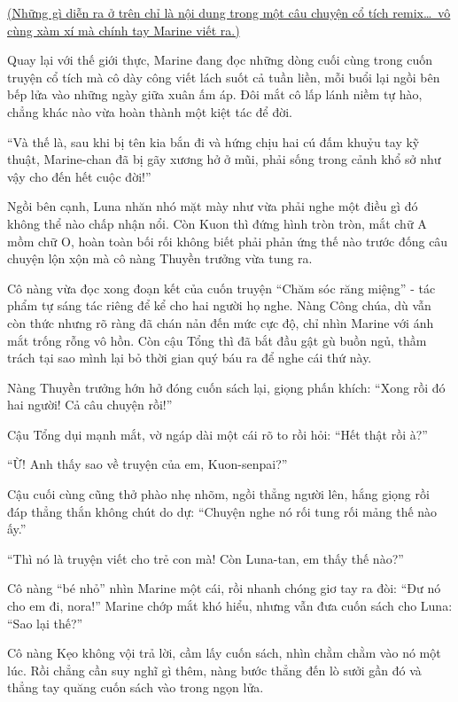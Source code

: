 \documentclass[../main.tex]{subfiles}
\begin{document}
\begin{center}
  \uline{(Những gì diễn ra ở trên chỉ là nội dung trong một câu chuyện cổ tích remix\dots\ vô cùng xàm xí mà chính tay Marine viết ra.)}
\end{center}

Quay lại với thế giới thực, Marine đang đọc những dòng cuối cùng trong cuốn truyện cổ tích mà cô dày công viết lách suốt cả tuần liền, mỗi buổi lại ngồi bên bếp lửa vào những ngày giữa xuân ấm áp. Đôi mắt cô lấp lánh niềm tự hào, chẳng khác nào vừa hoàn thành một kiệt tác để đời.

``Và thế là, sau khi bị tên kia bắn đi và hứng chịu hai cú đấm khuỷu tay kỹ thuật, Marine-chan đã bị gãy xương hở ở mũi, phải sống trong cảnh khổ sở như vậy cho đến hết cuộc đời!''

Ngồi bên cạnh, Luna nhăn nhó mặt mày như vừa phải nghe một điều gì đó không thể nào chấp nhận nổi. Còn Kuon thì đứng hình tròn tròn, mắt chữ A mồm chữ O, hoàn toàn bối rối không biết phải phản ứng thế nào trước đống câu chuyện lộn xộn mà cô nàng Thuyền trưởng vừa tung ra.


Cô nàng vừa đọc xong đoạn kết của cuốn truyện ``Chăm sóc răng miệng'' - tác phẩm tự sáng tác riêng để kể cho hai người họ  nghe. Nàng Công chúa, dù vẫn còn thức nhưng rõ ràng đã chán nản đến mức cực độ, chỉ nhìn Marine với ánh mắt trống rỗng vô hồn. Còn cậu Tổng thì đã bắt đầu gật gù buồn ngủ, thầm trách tại sao mình lại bỏ thời gian quý báu ra để nghe cái thứ này.

Nàng Thuyền trưởng hớn hở đóng cuốn sách lại, giọng phấn khích: ``Xong rồi đó hai người! Cả câu chuyện rồi!''

Cậu Tổng dụi mạnh mắt, vờ ngáp dài một cái rõ to rồi hỏi: ``Hết thật rồi à?''

``Ừ! Anh thấy sao về truyện của em, Kuon-senpai?''

Cậu cuối cùng cũng thở phào nhẹ nhõm, ngồi thẳng người lên, hắng giọng rồi đáp thẳng thắn không chút do dự: ``Chuyện nghe nó rối tung rối mảng thế nào ấy.''

``Thì nó là truyện viết cho trẻ con mà! Còn Luna-tan, em thấy thế nào?''

Cô nàng ``bé nhỏ'' nhìn Marine một cái, rồi nhanh chóng giơ tay ra đòi: ``Đư nó cho em đi, nora!'' Marine chớp mắt khó hiểu, nhưng vẫn đưa cuốn sách cho Luna: ``Sao lại thế?''

Cô nàng Kẹo không vội trả lời, cầm lấy cuốn sách, nhìn chằm chằm vào nó một lúc. Rồi chẳng cần suy nghĩ gì thêm, nàng bước thẳng đến lò sưởi gần đó và thẳng tay quăng cuốn sách vào trong ngọn lửa.
\end{document}
